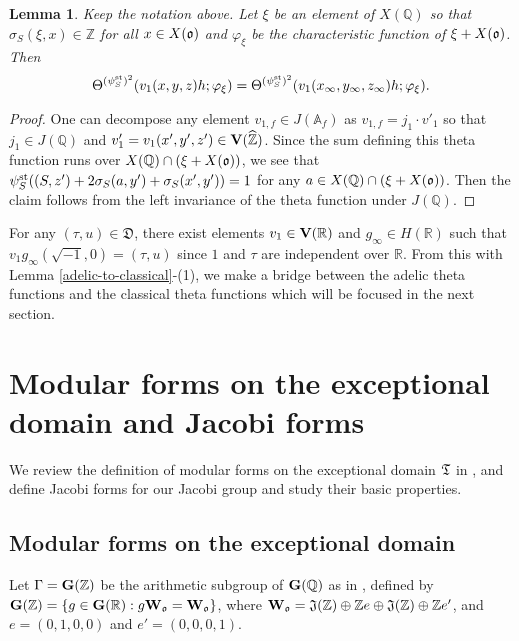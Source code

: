 \documentclass[11pt]{amsart}
\numberwithin{equation}{section}
\newtheorem{lemma}[theorem]{Lemma}
\theoremstyle{definition}
\begin{document}
\begin{lemma}\label{some-theta}
Keep the notation above. 
Let $\xi$ be an element of $X({\mathbb{Q}})$ so that $\sigma_S(\xi,x)\in {\mathbb{Z}}$ for all $x\in X(\frak o)$ and $\varphi_\xi$ be 
the characteristic function of $\xi+X(\frak o)$. 
Then $$\Theta^{(\psi^{{\rm st}}_S)^2}(v_1(x,y,z)h;\varphi_\xi)=
\Theta^{(\psi^{{\rm st}}_S)^2}(v_1(x_\infty,y_\infty,z_\infty)h;\varphi_\xi).$$
\end{lemma}
\begin{proof}One can decompose 
any element $v_{1,f}\in J({\mathbb{A}}_f)$ as $v_{1,f}=j_{1}\cdot v'_1$ so that $j_{1}\in J({\mathbb{Q}})$ and $v'_{1}=v_1(x',y',z')\in 
\bold V(\widehat{\mathbb{Z}})$. 
Since the sum defining this theta function runs over $X({\mathbb{Q}})\cap (\xi+X(\frak o))$, we see that 
$\psi^{{\rm st}}_S((S,z')+2\sigma_S(a,y')+\sigma_S(x',y'))=1$ for any $a\in X({\mathbb{Q}})\cap (\xi+X(\frak o))$. 
Then the claim follows from the left invariance of the theta function under $J({\mathbb{Q}})$.  
\end{proof}

For any $(\tau,u)\in \mathfrak{D}$, there exist elements $v_1\in \bold V({\mathbb{R}})$ and $g_\infty\in H({\mathbb{R}})$ such that 
$v_1g_\infty (\sqrt{-1},0)=(\tau,u)$ since $1$ and $\tau$ are independent over ${\mathbb{R}}$. 
From this with Lemma \ref{adelic-to-classical}-(1), we make a bridge between the adelic theta functions and 
the classical theta functions which will be focused in the next section. 

\section{Modular forms on the exceptional domain and Jacobi forms}\label{modular}

We review the definition of modular forms on the exceptional domain $\frak T$ in \cite{B}, and define Jacobi forms for our Jacobi group and study their basic properties. 

\subsection{Modular forms on the exceptional domain}
Let $\Gamma=\bold G({\mathbb{Z}})$ be the arithmetic subgroup of $\bold G({\mathbb{Q}})$ as in \cite{B},
defined by $\bold G({\mathbb{Z}})=\{g\in \bold G({\mathbb{R}}) : g\bold W_{\frak o}=\bold W_{\frak o}\}$, where 
$\bold W_{\frak o}=\frak J({\mathbb{Z}})\oplus {\mathbb{Z}} e\oplus\frak J({\mathbb{Z}})\oplus {\mathbb{Z}} e'$, and $e=(0,1,0,0)$ and $e'=(0,0,0,1)$. 
\end{document}
